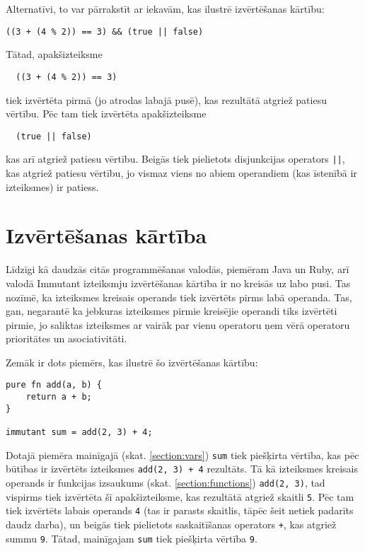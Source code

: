 \documentclass[12pt,a4paper]{report}
\begin{document}
Alternatīvi, to var pārrakstīt ar iekavām, kas ilustrē izvērtēšanas kārtību:
\begin{verbatim}
((3 + (4 % 2)) == 3) && (true || false)
\end{verbatim}

Tātad, apakšizteiksme 
\begin{verbatim}
  ((3 + (4 % 2)) == 3)
\end{verbatim}
tiek izvērtēta pirmā (jo atrodas labajā pusē), kas rezultātā atgriež patiesu vērtību.
Pēc tam tiek izvērtēta apakšizteiksme
\begin{verbatim}  (true || false)
\end{verbatim}
kas arī atgriež patiesu vērtību. Beigās tiek pielietots disjunkcijas operators \texttt{||}, kas atgriež patiesu vērtību, jo vismaz viens no abiem operandiem (kas īstenībā ir izteiksmes) ir patiess.

\section{Izvērtēšanas kārtība}
Līdzīgi kā daudzās citās programmēšanas valodās, piemēram Java un Ruby, arī valodā Immutant izteiksmju izvērtēšanas kārtība ir no kreisās uz labo pusi. Tas nozīmē, ka izteiksmes kreisais operands tiek izvērtēts pirms labā operanda. Tas, gan, negarantē ka jebkuras izteiksmes pirmie kreisējie operandi tiks izvērtēti pirmie, jo saliktas izteiksmes ar vairāk par vienu operatoru ņem vērā operatoru prioritātes un asociativitāti.

Zemāk ir dots piemērs, kas ilustrē šo izvērtēšanas kārtību:

\begin{verbatim}
pure fn add(a, b) {
    return a + b;
}

immutant sum = add(2, 3) + 4;
\end{verbatim}

Dotajā piemēra mainīgajā (skat. \ref{section:vars}) \texttt{sum} tiek piešķirta vērtība, kas pēc būtības ir  izvērtēts izteiksmes \texttt{add(2, 3) + 4} rezultāts. Tā kā izteiksmes kreisais operands ir funkcijas izsaukums (skat. \ref{section:functions}) \texttt{add(2, 3)}, tad vispirms tiek izvērtēta šī apakšizteiksme, kas rezultātā atgriež skaitli \texttt{5}. Pēc tam tiek izvērtēts labais operands \texttt{4} (tas ir parasts skaitlis, tāpēc šeit netiek padarīts daudz darba), un beigās tiek pielietots saskaitīšanas operators \texttt{+}, kas atgriež summu \texttt{9}. Tātad, mainīgajam \texttt{sum} tiek piešķirta vērtība \texttt{9}.
\end{document}

